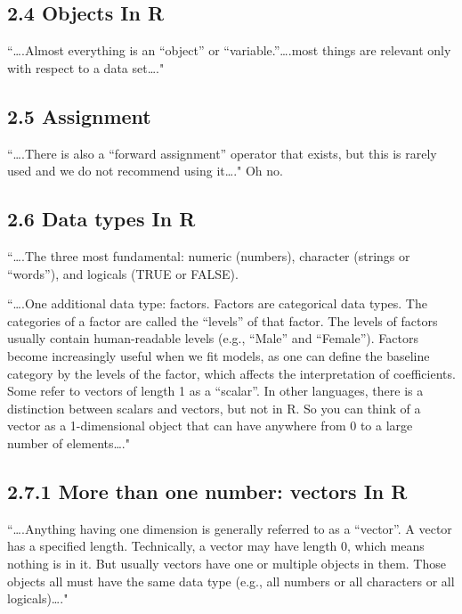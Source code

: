 \documentclass[]{article}
\begin{document}
\hypertarget{objects-in-r}{%
\subsection{2.4 Objects In R}\label{objects-in-r}}

``\ldots{}.Almost everything is an ``object'' or
``variable.''\ldots{}.most things are relevant only with respect to a
data set\ldots{}."

\hypertarget{assignment}{%
\subsection{2.5 Assignment}\label{assignment}}

``\ldots{}.There is also a ``forward assignment'' operator that exists,
but this is rarely used and we do not recommend using it\ldots{}." Oh
no.

\hypertarget{data-types-in-r}{%
\subsection{2.6 Data types In R}\label{data-types-in-r}}

``\ldots{}.The three most fundamental: numeric (numbers), character
(strings or ``words''), and logicals (TRUE or FALSE).

``\ldots{}.One additional data type: factors. Factors are categorical
data types. The categories of a factor are called the ``levels'' of that
factor. The levels of factors usually contain human-readable levels
(e.g., ``Male'' and ``Female''). Factors become increasingly useful when
we fit models, as one can define the baseline category by the levels of
the factor, which affects the interpretation of coefficients. Some refer
to vectors of length 1 as a ``scalar''. In other languages, there is a
distinction between scalars and vectors, but not in R. So you can think
of a vector as a 1-dimensional object that can have anywhere from 0 to a
large number of elements\ldots{}."

\hypertarget{more-than-one-number-vectors-in-r}{%
\subsection{2.7.1 More than one number: vectors In
R}\label{more-than-one-number-vectors-in-r}}

``\ldots{}.Anything having one dimension is generally referred to as a
``vector''. A vector has a specified length. Technically, a vector may
have length 0, which means nothing is in it. But usually vectors have
one or multiple objects in them. Those objects all must have the same
data type (e.g., all numbers or all characters or all
logicals)\ldots{}."
\end{document}
